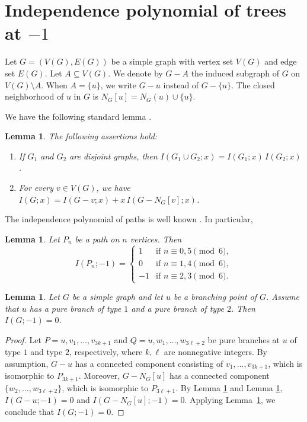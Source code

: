 \documentclass[12pt,amscd]{amsart}
\newtheorem{lem}[thm]{Lemma}
\theoremstyle{definition}
\numberwithin{equation}{section}
\begin{document}
\section{Independence polynomial of trees at $-1$}\label{sec_pre}
Let \( G = (V(G), E(G)) \) be a simple graph with vertex set \( V(G) \) and edge set \( E(G) \). Let \( A \subseteq V(G) \). We denote by \( G - A \) the induced subgraph of \( G \) on \( V(G) \setminus A \). When \( A = \{u\} \), we write \( G - u \) instead of \( G - \{u\} \). The closed neighborhood of \( u \) in \( G \) is \( N_G[u] = N_G(u) \cup \{u\} \).

We have the following standard lemma \cite{GH}.

\begin{lem}\label{techn}
The following assertions hold:
\begin{enumerate}
    \item If \( G_1 \) and \( G_2 \) are disjoint graphs, then \( I(G_1 \cup G_2; x) = I(G_1; x)\, I(G_2; x) \).
    \item For every \( v \in V(G) \), we have \( I(G; x) = I(G - v; x) + x\, I(G - N_G[v]; x) \).
\end{enumerate}
\end{lem}

The independence polynomial of paths is well known \cite{LM2}. In particular, 

\begin{lem}\label{paths}
Let \( P_n \) be a path on \( n \) vertices. Then
\[
I(P_n; -1) =
\begin{cases}
    1 & \text{if } n \equiv 0, 5 \pmod{6},\\
    0 & \text{if } n \equiv 1, 4 \pmod{6},\\
    -1 & \text{if } n \equiv 2, 3 \pmod{6}.
\end{cases}
\]
\end{lem}

\begin{lem}\label{lem_mix_1_2}
Let \( G \) be a simple graph and let \( u \) be a branching point of \( G \). Assume that \( u \) has a pure branch of type \( 1 \) and a pure branch of type \( 2 \). Then \( I(G;-1)=0 \).
\end{lem}

\begin{proof}
Let \( P = u, v_1, \ldots, v_{3k+1} \) and \( Q = u, w_1, \ldots, w_{3\ell+2} \) be pure branches at \( u \) of type \( 1 \) and type \( 2 \), respectively, where \( k, \ell \) are nonnegative integers. By assumption, \( G - u \) has a connected component consisting of \( v_1, \ldots, v_{3k+1} \), which is isomorphic to \( P_{3k+1} \). Moreover, \( G - N_G[u] \) has a connected component \( \{w_2, \ldots, w_{3\ell+2}\} \), which is isomorphic to \( P_{3\ell+1} \). By Lemma \ref{techn} and Lemma \ref{paths}, \( I(G-u;-1) = 0 \) and \( I(G-N_G[u];-1) = 0 \). Applying Lemma~\ref{techn}, we conclude that \( I(G;-1) = 0 \).
\end{proof}
\end{document}
